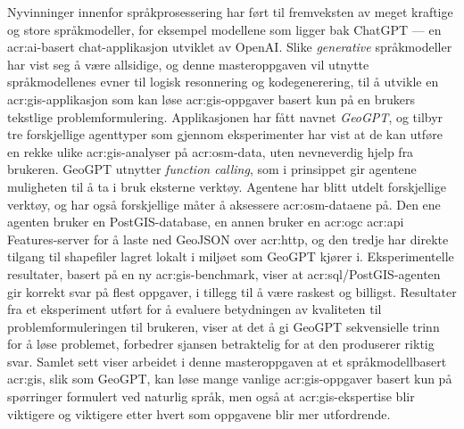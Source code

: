 Nyvinninger innenfor språkprosessering har ført til fremveksten av meget kraftige og store språkmodeller, for eksempel modellene som ligger bak ChatGPT --- en \acrshort{acr:ai}-basert chat-applikasjon utviklet av OpenAI. Slike \textit{generative} språkmodeller har vist seg å være allsidige, og denne masteroppgaven vil utnytte språkmodellenes evner til logisk resonnering og kodegenerering, til å utvikle en \acrshort{acr:gis}-applikasjon som kan løse \acrshort{acr:gis}-oppgaver basert kun på en brukers tekstlige problemformulering. Applikasjonen har fått navnet \textit{GeoGPT}, og tilbyr tre forskjellige agenttyper som gjennom eksperimenter har vist at de kan utføre en rekke ulike \acrshort{acr:gis}-analyser på \gls{acr:osm}-data, uten nevneverdig hjelp fra brukeren. GeoGPT utnytter \textit{function calling}, som i prinsippet gir agentene muligheten til å ta i bruk eksterne verktøy. Agentene har blitt utdelt forskjellige verktøy, og har også forskjellige måter å aksessere \gls{acr:osm}-dataene på. Den ene agenten bruker en PostGIS-database, en annen bruker en \acrshort{acr:ogc} \acrshort{acr:api} Features-server for å laste ned GeoJSON over \acrshort{acr:http}, og den tredje har direkte tilgang til shapefiler lagret lokalt i miljøet som GeoGPT kjører i. Eksperimentelle resultater, basert på en ny \acrshort{acr:gis}-benchmark, viser at \acrshort{acr:sql}/PostGIS-agenten gir korrekt svar på flest oppgaver, i tillegg til å være raskest og billigst. Resultater fra et eksperiment utført for å evaluere betydningen av kvaliteten til problemformuleringen til brukeren, viser at det å gi GeoGPT sekvensielle trinn for å løse problemet, forbedrer sjansen betraktelig for at den produserer riktig svar. Samlet sett viser arbeidet i denne masteroppgaven at et språkmodellbasert \acrshort{acr:gis}, slik som GeoGPT, kan løse mange vanlige \acrshort{acr:gis}-oppgaver basert kun på spørringer formulert ved naturlig språk, men også at \acrshort{acr:gis}-ekspertise blir viktigere og viktigere etter hvert som oppgavene blir mer utfordrende.


